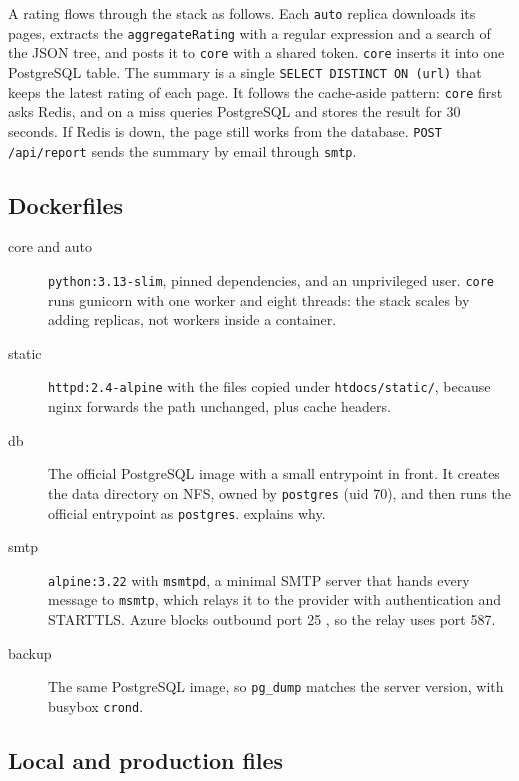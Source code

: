 A rating flows through the stack as follows. Each \texttt{auto} replica
downloads its pages, extracts the \texttt{aggregateRating} with a
regular expression and a search of the JSON tree, and posts it to
\texttt{core} with a shared token. \texttt{core} inserts it into one
PostgreSQL table. The summary is a single
\texttt{SELECT DISTINCT ON (url)} that keeps the latest rating of each
page. It follows the cache-aside pattern: \texttt{core} first asks
Redis, and on a miss queries PostgreSQL and stores the result for
30\,seconds. If Redis is down, the page still works from the database.
\texttt{POST /api/report} sends the summary by email through
\texttt{smtp}.

\subsection{Dockerfiles}

\begin{description}
  \item[core and auto] \texttt{python:3.13-slim}, pinned dependencies,
    and an unprivileged user. \texttt{core} runs gunicorn with one
    worker and eight threads: the stack scales by adding replicas, not
    workers inside a container.
  \item[static] \texttt{httpd:2.4-alpine} with the files copied under
    \texttt{htdocs/static/}, because nginx forwards the path unchanged,
    plus cache headers.
  \item[db] The official PostgreSQL image with a small entrypoint in
    front. It creates the data directory on NFS, owned by
    \texttt{postgres} (uid 70), and then runs the official entrypoint
    as \texttt{postgres}.  explains why.
  \item[smtp] \texttt{alpine:3.22} with \texttt{msmtpd}, a minimal SMTP
    server that hands every message to \texttt{msmtp}, which relays it
    to the provider with authentication and STARTTLS. Azure blocks
    outbound port 25 \parencite{azure-smtp}, so the relay uses port 587.
  \item[backup] The same PostgreSQL image, so \texttt{pg\_dump} matches
    the server version, with busybox \texttt{crond}.
\end{description}

\subsection{Local and production files}

